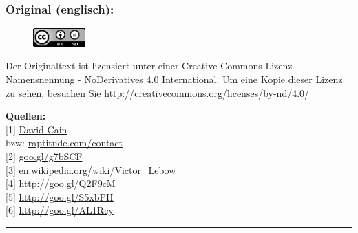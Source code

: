 \documentclass[10pt,a4paper,ngerman,twoside]{article} %
\newcommand{\SepRule}{\noindent	%
\begin{center}
\rule{250pt}{1pt} %
\end{center}
}
\begin{document}
\begin{multicols}{3}
\subsubsection*{Original (englisch):}

\begin{figure}
\includegraphics[width=2cm]{trillions/ccbynd88x31.png}
\end{figure}
Der Originaltext ist lizensiert unter einer Creative-Commons-Lizenz Namensnennung - NoDerivatives 4.0 International. Um eine Kopie dieser Lizenz zu sehen, besuchen Sie \url{http://creativecommons.org/licenses/by-nd/4.0/}


\textbf{Quellen:} \\
{[}1{]} \href{https://twitter.com/DavidDCain}{David Cain} \\
bzw: \href{http://www.raptitude.com/contact/}{raptitude.com/contact} \\
{[}2{]} \href{http://www.raptitude.com/2011/01/how-to-make-trillions-of-dollars/}{goo.gl/g7bSCF} \\
{[}3{]} \href{https://en.wikipedia.org/wiki/Victor\_Lebow}{en.wikipedia.org/wiki/Victor\_Lebow} \\
{[}4{]} \href{http://www.raptitude.com/2010/10/being-healthy-is-not-normal/}{http://goo.gl/Q2F9cM} \\
{[}5{]} \href{http://www.raptitude.com/2011/01/i-dont-want-stuff-any-more-only-things/}{http://goo.gl/S5xbPH} \\
{[}6{]} \href{http://www.raptitude.com/2010/07/your-lifestyle-has-already-been-designed/}{http://goo.gl/AL1Rcy} 

\end{multicols}
\SepRule{}
\end{document}
